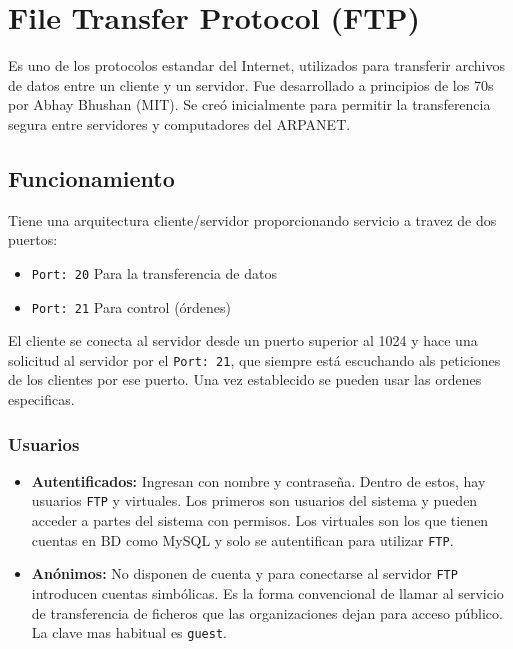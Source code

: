 \section*{File Transfer Protocol (FTP)}
Es uno de los protocolos estandar del Internet, utilizados para transferir archivos de datos entre un cliente y un servidor. Fue desarrollado a principios de los 70s por Abhay Bhushan (MIT). Se creó inicialmente para permitir la transferencia segura entre servidores y computadores del ARPANET.
\subsection*{Funcionamiento}
Tiene una arquitectura cliente/servidor proporcionando servicio a travez  de dos puertos:
\begin{itemize}
\item \texttt{Port: 20} Para la transferencia de datos
\item \texttt{Port: 21} Para control (órdenes)
\end{itemize}
El cliente se conecta al servidor desde un puerto superior al 1024 y hace una solicitud al servidor por el \texttt{Port: 21}, que siempre está escuchando als peticiones de los clientes por ese puerto. Una vez establecido se pueden usar las ordenes especificas.
\subsubsection*{Usuarios}
\begin{itemize}
\item \textbf{Autentificados:} Ingresan con nombre y contraseña. Dentro de estos, hay usuarios \texttt{FTP} y virtuales.  Los primeros son usuarios del sistema y pueden acceder a partes del sistema con permisos. Los virtuales son los que tienen cuentas en BD como MySQL y solo se autentifican para utilizar \texttt{FTP}.
\item \textbf{Anónimos:} No disponen de cuenta y para conectarse al servidor \texttt{FTP} introducen cuentas simbólicas. Es la forma convencional de llamar al servicio de transferencia de ficheros que las organizaciones dejan para acceso público. La clave mas habitual es \texttt{guest}.
\end{itemize}
